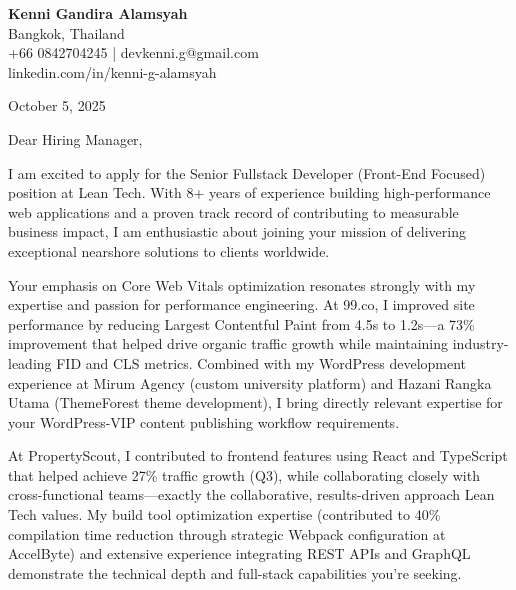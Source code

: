 \documentclass[11pt,a4paper]{article}
\begin{document}
\begin{flushleft}
\textbf{\Large Kenni Gandira Alamsyah}\\
Bangkok, Thailand\\
+66 0842704245 | devkenni.g@gmail.com\\
linkedin.com/in/kenni-g-alamsyah
\end{flushleft}

\vspace{1em}

October 5, 2025

\vspace{1em}

Dear Hiring Manager,

\vspace{1em}

I am excited to apply for the Senior Fullstack Developer (Front-End Focused) position at Lean Tech. With 8+ years of experience building high-performance web applications and a proven track record of contributing to measurable business impact, I am enthusiastic about joining your mission of delivering exceptional nearshore solutions to clients worldwide.

\vspace{1em}

Your emphasis on Core Web Vitals optimization resonates strongly with my expertise and passion for performance engineering. At 99.co, I improved site performance by reducing Largest Contentful Paint from 4.5s to 1.2s---a 73\% improvement that helped drive organic traffic growth while maintaining industry-leading FID and CLS metrics. Combined with my WordPress development experience at Mirum Agency (custom university platform) and Hazani Rangka Utama (ThemeForest theme development), I bring directly relevant expertise for your WordPress-VIP content publishing workflow requirements.

\vspace{1em}

At PropertyScout, I contributed to frontend features using React and TypeScript that helped achieve 27\% traffic growth (Q3), while collaborating closely with cross-functional teams---exactly the collaborative, results-driven approach Lean Tech values. My build tool optimization expertise (contributed to 40\% compilation time reduction through strategic Webpack configuration at AccelByte) and extensive experience integrating REST APIs and GraphQL demonstrate the technical depth and full-stack capabilities you're seeking.
\end{document}
